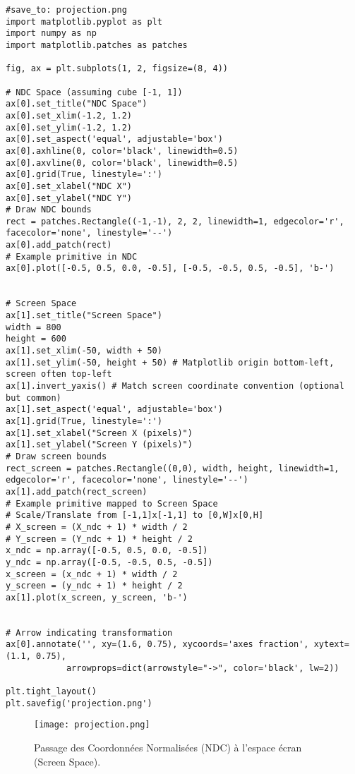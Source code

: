 \documentclass{article}
\begin{document}
\begin{verbatim}
#save_to: projection.png
import matplotlib.pyplot as plt
import numpy as np
import matplotlib.patches as patches

fig, ax = plt.subplots(1, 2, figsize=(8, 4))

# NDC Space (assuming cube [-1, 1])
ax[0].set_title("NDC Space")
ax[0].set_xlim(-1.2, 1.2)
ax[0].set_ylim(-1.2, 1.2)
ax[0].set_aspect('equal', adjustable='box')
ax[0].axhline(0, color='black', linewidth=0.5)
ax[0].axvline(0, color='black', linewidth=0.5)
ax[0].grid(True, linestyle=':')
ax[0].set_xlabel("NDC X")
ax[0].set_ylabel("NDC Y")
# Draw NDC bounds
rect = patches.Rectangle((-1,-1), 2, 2, linewidth=1, edgecolor='r', facecolor='none', linestyle='--')
ax[0].add_patch(rect)
# Example primitive in NDC
ax[0].plot([-0.5, 0.5, 0.0, -0.5], [-0.5, -0.5, 0.5, -0.5], 'b-')


# Screen Space
ax[1].set_title("Screen Space")
width = 800
height = 600
ax[1].set_xlim(-50, width + 50)
ax[1].set_ylim(-50, height + 50) # Matplotlib origin bottom-left, screen often top-left
ax[1].invert_yaxis() # Match screen coordinate convention (optional but common)
ax[1].set_aspect('equal', adjustable='box')
ax[1].grid(True, linestyle=':')
ax[1].set_xlabel("Screen X (pixels)")
ax[1].set_ylabel("Screen Y (pixels)")
# Draw screen bounds
rect_screen = patches.Rectangle((0,0), width, height, linewidth=1, edgecolor='r', facecolor='none', linestyle='--')
ax[1].add_patch(rect_screen)
# Example primitive mapped to Screen Space
# Scale/Translate from [-1,1]x[-1,1] to [0,W]x[0,H]
# X_screen = (X_ndc + 1) * width / 2
# Y_screen = (Y_ndc + 1) * height / 2
x_ndc = np.array([-0.5, 0.5, 0.0, -0.5])
y_ndc = np.array([-0.5, -0.5, 0.5, -0.5])
x_screen = (x_ndc + 1) * width / 2
y_screen = (y_ndc + 1) * height / 2
ax[1].plot(x_screen, y_screen, 'b-')


# Arrow indicating transformation
ax[0].annotate('', xy=(1.6, 0.75), xycoords='axes fraction', xytext=(1.1, 0.75),
            arrowprops=dict(arrowstyle="->", color='black', lw=2))

plt.tight_layout()
plt.savefig('projection.png')
\end{verbatim}

\begin{figure}[H]
\centering
\texttt{[image: projection.png]}
\caption{Passage des Coordonnées Normalisées (NDC) à l'espace écran (Screen Space).}
\label{fig:projection}
\end{figure}
\end{document}
